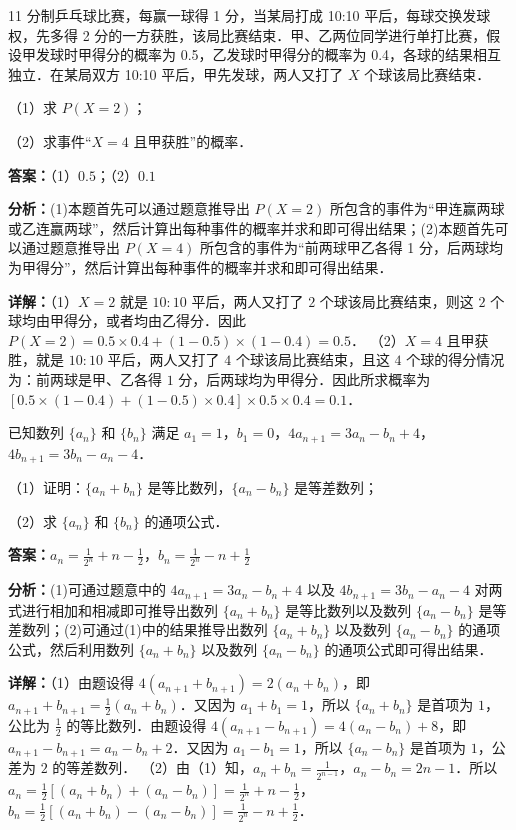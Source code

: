 \begin{question}[points=12]
11 分制乒乓球比赛，每赢一球得 1 分，当某局打成 10:10 平后，每球交换发球权，先多得 2 分的一方获胜，该局比赛结束．甲、乙两位同学进行单打比赛，假设甲发球时甲得分的概率为 0.5，乙发球时甲得分的概率为 0.4，各球的结果相互独立．在某局双方 10:10 平后，甲先发球，两人又打了 $X$ 个球该局比赛结束．

（1）求 $P(X=2)$；

（2）求事件“$X=4$ 且甲获胜”的概率．
\begin{solution}
\textbf{答案：}（1）$0.5$；（2）$0.1$

\textbf{分析：}(1)本题首先可以通过题意推导出 $P(X=2)$ 所包含的事件为“甲连赢两球或乙连赢两球”，然后计算出每种事件的概率并求和即可得出结果；(2)本题首先可以通过题意推导出 $P(X=4)$ 所包含的事件为“前两球甲乙各得 1 分，后两球均为甲得分”，然后计算出每种事件的概率并求和即可得出结果．

\textbf{详解：}（1）$X=2$ 就是 $10:10$ 平后，两人又打了 $2$ 个球该局比赛结束，则这 $2$ 个球均由甲得分，或者均由乙得分．因此 $P(X=2)=0.5\times0.4+(1-0.5)\times(1-0.4)=0.5$．
（2）$X=4$ 且甲获胜，就是 $10:10$ 平后，两人又打了 $4$ 个球该局比赛结束，且这 $4$ 个球的得分情况为：前两球是甲、乙各得 $1$ 分，后两球均为甲得分．因此所求概率为 $[0.5\times(1-0.4)+(1-0.5)\times0.4]\times0.5\times0.4=0.1$．
\end{solution}
\end{question}

\begin{question}[points=12]
已知数列 $\{a_n\}$ 和 $\{b_n\}$ 满足 $a_1=1$，$b_1=0$，$4a_{n+1}=3a_n-b_n+4$，$4b_{n+1}=3b_n-a_n-4$．

（1）证明：$\{a_n+b_n\}$ 是等比数列，$\{a_n-b_n\}$ 是等差数列；

（2）求 $\{a_n\}$ 和 $\{b_n\}$ 的通项公式．
\begin{solution}
\textbf{答案：}$a_n=\frac{1}{2^n}+n-\frac{1}{2}$，$b_n=\frac{1}{2^n}-n+\frac{1}{2}$

\textbf{分析：}(1)可通过题意中的 $4a_{n+1}=3a_n-b_n+4$ 以及 $4b_{n+1}=3b_n-a_n-4$ 对两式进行相加和相减即可推导出数列 $\{a_n+b_n\}$ 是等比数列以及数列 $\{a_n-b_n\}$ 是等差数列；(2)可通过(1)中的结果推导出数列 $\{a_n+b_n\}$ 以及数列 $\{a_n-b_n\}$ 的通项公式，然后利用数列 $\{a_n+b_n\}$ 以及数列 $\{a_n-b_n\}$ 的通项公式即可得出结果．

\textbf{详解：}（1）由题设得 $4(a_{n+1}+b_{n+1})=2(a_n+b_n)$，即 $a_{n+1}+b_{n+1}=\frac{1}{2}(a_n+b_n)$．又因为 $a_1+b_1=1$，所以 $\{a_n+b_n\}$ 是首项为 $1$，公比为 $\frac{1}{2}$ 的等比数列．由题设得 $4(a_{n+1}-b_{n+1})=4(a_n-b_n)+8$，即 $a_{n+1}-b_{n+1}=a_n-b_n+2$．又因为 $a_1-b_1=1$，所以 $\{a_n-b_n\}$ 是首项为 $1$，公差为 $2$ 的等差数列．
（2）由（1）知，$a_n+b_n=\frac{1}{2^{n-1}}$，$a_n-b_n=2n-1$．所以 $a_n=\frac{1}{2}[(a_n+b_n)+(a_n-b_n)]=\frac{1}{2^n}+n-\frac{1}{2}$，$b_n=\frac{1}{2}[(a_n+b_n)-(a_n-b_n)]=\frac{1}{2^n}-n+\frac{1}{2}$．
\end{solution}
\end{question}

